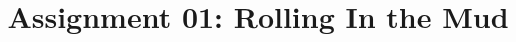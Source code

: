 \documentclass{article}
\title{Assignment 01: Rolling In the Mud}
\begin{document}
\renderTitle
\end{document}
